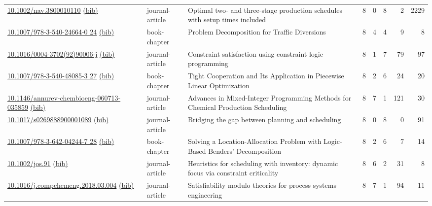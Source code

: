 {\begin{longtable}{p{5cm}lp{11cm}rrrrr}
\href{http://dx.doi.org/10.1002/nav.3800010110}{10.1002/nav.3800010110} \href{https://www.doi2bib.org/bib/10.1002/nav.3800010110}{(bib)} & journal-article & Optimal two‐ and three‐stage production schedules with setup times included & 8 & 0 & 8 & 2 & 2229 \\
\href{http://dx.doi.org/10.1007/978-3-540-24664-0_24}{10.1007/978-3-540-24664-0 24} \href{https://www.doi2bib.org/bib/10.1007/978-3-540-24664-0_24}{(bib)} & book-chapter & Problem Decomposition for Traffic Diversions & 8 & 4 & 4 & 9 & 8 \\
\href{http://dx.doi.org/10.1016/0004-3702(92)90006-j}{10.1016/0004-3702(92)90006-j} \href{https://www.doi2bib.org/bib/10.1016/0004-3702(92)90006-j}{(bib)} & journal-article & Constraint satisfaction using constraint logic programming & 8 & 1 & 7 & 79 & 97 \\
\href{http://dx.doi.org/10.1007/978-3-540-48085-3_27}{10.1007/978-3-540-48085-3 27} \href{https://www.doi2bib.org/bib/10.1007/978-3-540-48085-3_27}{(bib)} & book-chapter & Tight Cooperation and Its Application in Piecewise Linear Optimization & 8 & 2 & 6 & 24 & 20 \\
\href{http://dx.doi.org/10.1146/annurev-chembioeng-060713-035859}{10.1146/annurev-chembioeng-060713-035859} \href{https://www.doi2bib.org/bib/10.1146/annurev-chembioeng-060713-035859}{(bib)} & journal-article & Advances in Mixed-Integer Programming Methods for Chemical Production Scheduling & 8 & 7 & 1 & 121 & 30 \\
\href{http://dx.doi.org/10.1017/s0269888900001089}{10.1017/s0269888900001089} \href{https://www.doi2bib.org/bib/10.1017/s0269888900001089}{(bib)} & journal-article & Bridging the gap between planning and scheduling & 8 & 0 & 8 & 0 & 91 \\
\href{http://dx.doi.org/10.1007/978-3-642-04244-7_28}{10.1007/978-3-642-04244-7 28} \href{https://www.doi2bib.org/bib/10.1007/978-3-642-04244-7_28}{(bib)} & book-chapter & Solving a Location-Allocation Problem with Logic-Based Benders' Decomposition & 8 & 2 & 6 & 7 & 14 \\
\href{http://dx.doi.org/10.1002/jos.91}{10.1002/jos.91} \href{https://www.doi2bib.org/bib/10.1002/jos.91}{(bib)} & journal-article & Heuristics for scheduling with inventory: dynamic focus via constraint criticality & 8 & 6 & 2 & 31 & 8 \\
\href{http://dx.doi.org/10.1016/j.compchemeng.2018.03.004}{10.1016/j.compchemeng.2018.03.004} \href{https://www.doi2bib.org/bib/10.1016/j.compchemeng.2018.03.004}{(bib)} & journal-article & Satisfiability modulo theories for process systems engineering & 8 & 7 & 1 & 94 & 11 \\

\end{longtable}}
